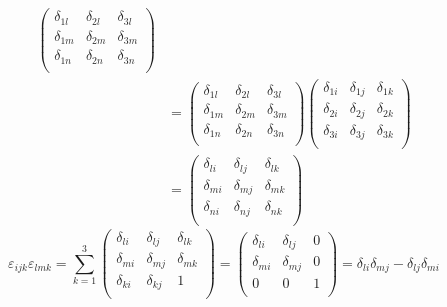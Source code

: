 \begin{align}
\begin{pmatrix}
                                           \delta_{1l} & \delta_{2l} & \delta_{3l} \\
                                           \delta_{1m} & \delta_{2m} & \delta_{3m} \\
                                           \delta_{1n} & \delta_{2n} & \delta_{3n} \\
                                       \end{pmatrix}\nonumber   \\
     & =\begin{pmatrix}
                  \delta_{1l} & \delta_{2l} & \delta_{3l} \\
                  \delta_{1m} & \delta_{2m} & \delta_{3m} \\
                  \delta_{1n} & \delta_{2n} & \delta_{3n} \\
              \end{pmatrix}\begin{pmatrix}
                                           \delta_{1i} & \delta_{1j} & \delta_{1k} \\
                                           \delta_{2i} & \delta_{2j} & \delta_{2k} \\
                                           \delta_{3i} & \delta_{3j} & \delta_{3k} \\
                                       \end{pmatrix}\nonumber   \\
     & =\begin{pmatrix}
                  \delta_{li} & \delta_{lj} & \delta_{lk} \\
                  \delta_{mi} & \delta_{mj} & \delta_{mk} \\
                  \delta_{ni} & \delta_{nj} & \delta_{nk} \\
              \end{pmatrix}
\end{align}
\begin{equation}
    \varepsilon_{ijk}\varepsilon_{lmk}
      =\sum_{k=1}^{3}\begin{pmatrix}
                                \delta_{li} & \delta_{lj} & \delta_{lk} \\
                                \delta_{mi} & \delta_{mj} & \delta_{mk} \\
                                \delta_{ki} & \delta_{kj} & 1           \\
                            \end{pmatrix} =\begin{pmatrix}
                  \delta_{li} & \delta_{lj} & 0 \\
                  \delta_{mi} & \delta_{mj} & 0 \\
                  0           & 0           & 1 \\
              \end{pmatrix} =\delta_{li}\delta_{mj}-\delta_{lj}\delta_{mi}
\end{equation}
